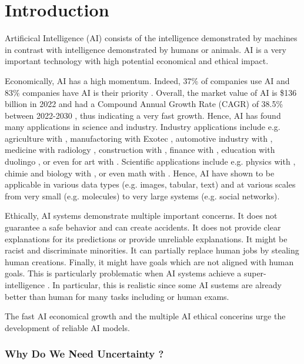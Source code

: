 \chapter{Introduction}
\label{chap:introduction}

Artificical Intelligence (AI) consists of the intelligence demonstrated by machines in contrast with intelligence demonstrated by humans or animals.
AI is a very important technology with high potential economical and ethical impact. 

Economically, AI has a high momentum. Indeed, 37\% of companies use AI  and 83\% companies have AI is their priority . Overall, the market value of AI is \$136 billion in 2022  and had a Compound Annual Growth Rate (CAGR) of 38.5\% between 2022-2030 , thus indicating a very fast growth.
Hence, AI has found many applications in science and industry. 
Industry applications include e.g. agriculture with , manufactoring with Exotec , automotive industry with , medicine with radiology , construction with , finance with , education with duolingo , or even for art with .
Scientific applications include e.g. physics with , chimie and biology with , or even math with .
Hence, AI have shown to be applicable in various data types (e.g. images, tabular, text) and at various scales from very small (e.g. molecules) to very large systems (e.g. social networks).

Ethically, AI systems demonstrate multiple important concerns.
It does not guarantee a safe behavior and can create accidents.
It does not provide clear explanations for its predictions or provide unreliable explanations.
It might be racist and discriminate minorities.
It can partially replace human jobs by stealing human creations.
Finally, it might have goals which are not aligned with human goals. This is particularly problematic when AI systems achieve a super-intelligence . In particular, this is realistic since some AI sustems are already better than human for many tasks including  or human exams.

The fast AI economical growth and the multiple AI ethical concerins urge the development of reliable AI models.

\subsection{Why Do We Need Uncertainty ?}

